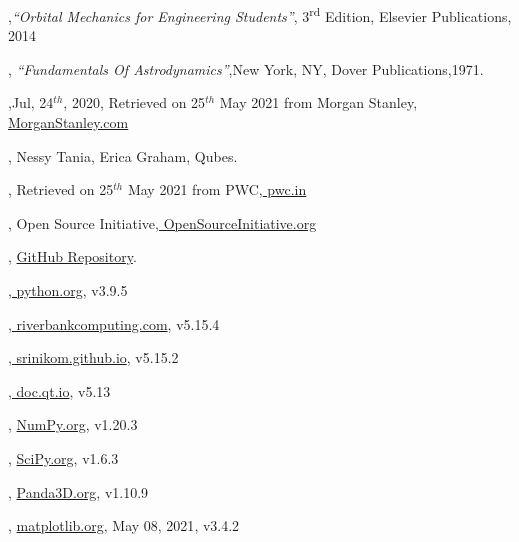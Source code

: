 \documentclass[12pt]{article}
\begin{document}
\begin{thebibliography}{99}
	,{\textit{\enquote{Orbital Mechanics for Engineering Students}}},{ 3\textsuperscript{rd} Edition}, { Elsevier Publications},{ 2014}	
	
	,{ \textit{\enquote{Fundamentals Of Astrodynamics}}},{New York, NY},{ Dover Publications},{1971}.
	
	,{Jul, 24$^{th}$, 2020}, { Retrieved on 25$^{th}$ May 2021 from Morgan Stanley},{\href{https://www.morganstanley.com/ideas/investing-in-space}{ MorganStanley.com}}
	
	,{ Nessy Tania, Erica Graham}, {Qubes.}
	
	,{ Retrieved on 25$^{th}$ May 2021 from PWC},{\href{https://www.pwc.in/research-insights/2020/preparing-to-scale-new-heights.html}{ pwc.in}}
	
	\bibitem{}
	
	,{ Open Source Initiative},{\href{https://opensource.org/licenses/gpl-3.0.html}{ OpenSourceInitiative.org}}

	, {\href{https://github.com/iamlrk/MOPy}{GitHub Repository}}.
	
	,{\href{https://docs.python.org}{ python.org}},{ v3.9.5}
	
	,{\href{https://www.riverbankcomputing.com/static/Docs/PyQt5/}{ riverbankcomputing.com}},{ v5.15.4}
	
	,{\href{https://srinikom.github.io/pyside-docs/pysideapi2.html}{ srinikom.github.io}},{ v5.15.2}
	
	,{\href{https://doc.qt.io/qt-5/qtdesigner-manual.html}{ doc.qt.io}},{ v5.13}
	
	, {\href{https://numpy.org/doc}{ NumPy.org}},{ v1.20.3}
	
	, {\href{https://scipy.org/doc}{ SciPy.org}},{ v1.6.3}
	
	, {\href{https://docs.panda3d.org/1.10/python/index}{ Panda3D.org}},{ v1.10.9}
	
	, {\href{https://matplotlib.org/stable/contents.html}{ matplotlib.org}}, {May 08, 2021}, { v3.4.2}
	
\end{thebibliography}
\end{document}
